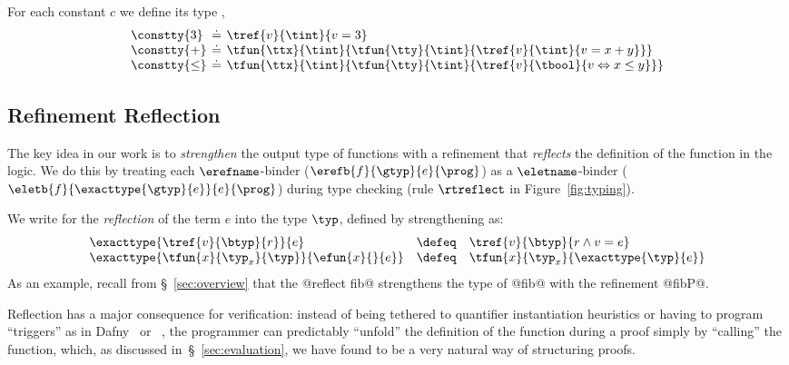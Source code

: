 For each constant $c$ we define its type , \eg%
%
$$
\setlength\arraycolsep{2pt}
\begin{array}{lcl}
\constty{3} &\doteq& \tref{v}{\tint}{v = 3}\\
\constty{+} &\doteq& \tfun{\ttx}{\tint}{\tfun{\tty}{\tint}{\tref{v}{\tint}{v = x + y}}}\\
\constty{\leq} &\doteq& \tfun{\ttx}{\tint}{\tfun{\tty}{\tint}{\tref{v}{\tbool}{v \Leftrightarrow x \leq y}}}\\
\end{array}
$$
%

\subsection{Refinement Reflection}\label{subsec:logicalannotations}
%
The key idea in our work is to
\emph{strengthen} the output type of functions
with a refinement that \emph{reflects} the
definition of the function in the logic.
%
We do this by treating each
%
$\erefname$-binder
%
(${\erefb{f}{\gtyp}{e}{\prog}}$)
%
as a $\eletname$-binder
%
(${\eletb{f}{\exacttype{\gtyp}{e}}{e}{\prog}}$)
%
during type checking (rule $\rtreflect$ in Figure~\ref{fig:typing}).

%
We write  for the \emph{reflection}
of the term $e$ into the type $\typ$,  defined by strengthening
\typ as:
%
$$
\begin{array}{lcl}
\exacttype{\tref{v}{\btyp}{r}}{e}
  & \defeq
  & \tref{v}{\btyp}{r \land v = e}\\
\exacttype{\tfun{x}{\typ_x}{\typ}}{\efun{x}{}{e}}
  & \defeq
  & \tfun{x}{\typ_x}{\exacttype{\typ}{e}}
\end{array}
$$
%
As an example, recall from \S~\ref{sec:overview}
that the @reflect fib@ strengthens the type of
@fib@ with the refinement @fibP@.

%
Reflection has a major consequence for verification:
%
instead of being tethered to quantifier
instantiation heuristics or having to
program ``triggers'' as in
Dafny~\citep{dafny} or \fstar~\citep{fstar},
%
the programmer can predictably ``unfold'' the
definition of the function during a proof simply
by ``calling'' the function, which, as discussed
in~\S~\ref{sec:evaluation}, we have found to be
a very natural way of structuring proofs.


